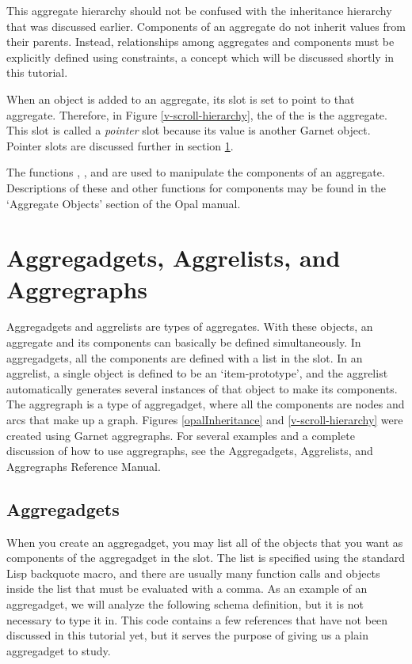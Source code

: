 This aggregate hierarchy should not be confused with the inheritance
hierarchy that was discussed earlier.  Components of an aggregate do
not inherit values from their parents.  Instead, relationships among
aggregates and components must be explicitly defined using
constraints, a concept which will be discussed shortly in this tutorial.

When an object is added to an aggregate, its  slot is set
to point to that aggregate.  Therefore, in Figure \ref{v-scroll-hierarchy},
the  of the  is the 
aggregate.  This  slot is called a {\it pointer} slot because
its value is another Garnet object.  Pointer slots are discussed
further in section \ref{aggregadgets}.

The functions , ,
and  are used to manipulate the components of an
aggregate.  Descriptions of these and other functions for components
may be found in the `Aggregate Objects' section of the Opal manual.


\section{Aggregadgets, Aggrelists, and Aggregraphs}
\label{aggregadgets}

Aggregadgets and aggrelists are types of aggregates.  With these
objects, an aggregate and its components can basically be defined
simultaneously.  In aggregadgets, all the components are defined
with a list in the  slot.  In an aggrelist, a single object
is defined to be an `item-prototype', and the aggrelist automatically
generates several instances of that object to make its components.
The aggregraph is a type of aggregadget, where all the components are
nodes and arcs that make up a graph.  Figures \ref{opalInheritance}
and \ref{v-scroll-hierarchy} were created using Garnet aggregraphs.
For several examples and a complete discussion of how to use
aggregraphs, see the Aggregadgets, Aggrelists, and Aggregraphs
Reference Manual.


\subsection{Aggregadgets}

When you create an aggregadget, you may list all of the objects that
you want as components of the aggregadget in the  slot.
The list is specified using the standard Lisp backquote macro, and
there are usually many function calls and objects inside the list that
must be evaluated with a comma.  As an example of an aggregadget, we
will analyze the following schema definition, but it is not necessary
to type it in.  This code contains a few references that have not been
discussed in this tutorial yet, but it serves the purpose of giving us
a plain aggregadget to study.

